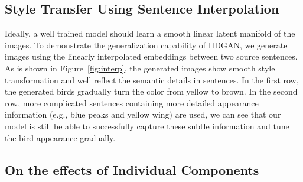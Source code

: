 \documentclass[10pt,twocolumn,letterpaper]{article}
\begin{document}
\subsection{Style Transfer Using Sentence Interpolation}
Ideally, a well trained model should learn a smooth linear latent manifold of the images. To demonstrate the generalization capability of HDGAN, we generate images using the linearly interpolated embeddings between two source sentences. %
As is shown in Figure~\ref{fig:interp}, the generated images show smooth style transformation and well reflect the semantic details in sentences. 
In the first row, the generated birds gradually turn the color from yellow to brown. In the second row, more complicated sentences containing more detailed appearance information (e.g., blue peaks and yellow wing) are used, we can see that our model is still be able to successfully capture these subtle information and tune the bird appearance gradually. 






\subsection{On the effects of Individual Components}
\end{document}
